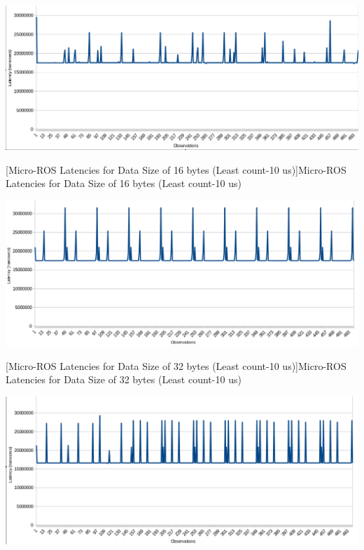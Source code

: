 \documentclass[%
xelatex,
	oneside,		%
	12pt,			%
	parskip=half,	%
	abstracton,
	chapterprefix=true%
    appendixprefix=true]
{scrbook}
\begin{document}
\begin{itemize}
\begin{center}
\includegraphics[scale=0.32]{fig/uros16byte.png}

[Micro-ROS Latencies for Data Size of 16 bytes (Least count-10 us)]{Micro-ROS Latencies for Data Size of 16 bytes (Least count-10 us)}
\label{fig:uros16byte}
\end{center}

\begin{center}
\includegraphics[scale=0.32]{fig/uros32byte.png}

[Micro-ROS Latencies for Data Size of 32 bytes (Least count-10 us)]{Micro-ROS Latencies for Data Size of 32 bytes (Least count-10 us)}
\label{fig:uros32byte}
\end{center}

\begin{center}
\includegraphics[scale=0.32]{fig/uros64byte.png}


\end{center}
\end{itemize}
\end{document}
